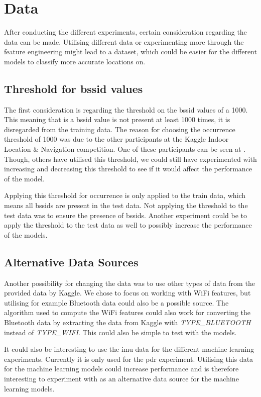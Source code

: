 \section{Data}
After conducting the different experiments, certain consideration regarding the data can be made. Utilising different data or experimenting more through the feature engineering might lead to a dataset, which could be easier for the different models to classify more accurate locations on.

\subsection{Threshold for \gls{bssid} values}
The first consideration is regarding the threshold on the \gls{bssid} values of a 1000. This meaning that is a \gls{bssid} value is not present at least 1000 times, it is disregarded from the training data. The reason for choosing the occurrence threshold of 1000 was due to the other participants at the Kaggle Indoor Location \& Navigation competition. One of these participants can be seen at \cite{BSSID1000}. Though, others have utilised this threshold, we could still have experimented with increasing and decreasing this threshold to see if it would affect the performance of the model.

Applying this threshold for occurrence is only applied to the train data, which means all \gls{bssid}s are present in the test data. Not applying the threshold to the test data was to ensure the presence of \gls{bssid}s. Another experiment could be to apply the threshold to the test data as well to possibly increase the performance of the models.

\subsection{Alternative Data Sources}
Another possibility for changing the data was to use other types of data from the provided data by Kaggle. We chose to focus on working with WiFi features, but utilising for example Bluetooth data could also be a possible source. The algorithm used to compute the WiFi features could also work for converting the Bluetooth data by extracting the data from Kaggle with \textit{TYPE\_BLUETOOTH} instead of \textit{TYPE\_WIFI}. This could also be simple to test with the models.

It could also be interesting to use the \gls{imu} data for the different machine learning experiments. Currently it is only used for the \gls{pdr} experiment. Utilising this data for the machine learning models could increase performance and is therefore interesting to experiment with as an alternative data source for the machine learning models.

